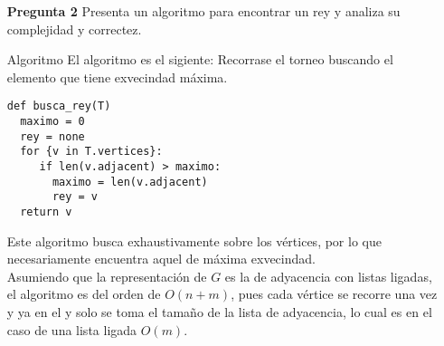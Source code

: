 \documentclass[12pt]{article}
\begin{document}
\lstset{language=python}

\begin{itemize}
\item[\bf{Pregunta 2}] Presenta un algoritmo para encontrar un rey y analiza su complejidad y correctez.

\item[Algoritmo]
  El algoritmo es el sigiente:
  Recorrase el torneo buscando el elemento que tiene exvecindad máxima.

\begin{lstlisting}[frame=single] 
  def busca_rey(T)
  maximo = 0
  rey = none
  for {v in T.vertices}:
     if len(v.adjacent) > maximo:
       maximo = len(v.adjacent)
       rey = v
  return v
\end{lstlisting}

Este algoritmo busca exhaustivamente sobre los vértices, por lo que necesariamente encuentra aquel de máxima exvecindad.\\
Asumiendo que la representación de $G$ es la  de adyacencia con listas ligadas, el algoritmo es del orden de $O(n + m)$, pues cada vértice se recorre una vez y ya en el y solo se toma el tamaño de la lista de adyacencia, lo cual es en el caso de una lista ligada $O(m)$.

\end{itemize}
\end{document}
